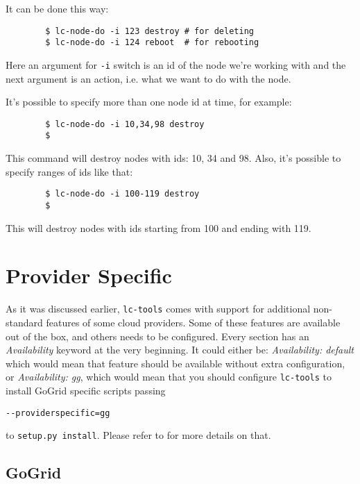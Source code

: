 \documentclass[a4paper]{report}
\begin{document}
	       It can be done this way:

	       \begin{verbatim}
		$ lc-node-do -i 123 destroy # for deleting
		$ lc-node-do -i 124 reboot  # for rebooting
		\end{verbatim}

	       Here an argument for \texttt{-i} switch is an id of the node we're working
	       with and the next argument is an action, i.e. what we want to do with the node.

	       It's possible to specify more than one node id at time, for example:

	       \begin{verbatim}
		$ lc-node-do -i 10,34,98 destroy
		$
		\end{verbatim}

	       This command will destroy nodes with ids: 10, 34 and 98. Also, it's possible to
	       specify ranges of ids like that:

	       \begin{verbatim}
		$ lc-node-do -i 100-119 destroy
		$
		\end{verbatim}

	      This will destroy nodes with ids starting from 100 and ending with 119.

\section{Provider Specific} \label{provspec}

As it was discussed earlier, {\tt lc-tools} comes with support for additional
non-standard features of some cloud providers. Some of these features are available
out of the box, and others needs to be configured. Every section has an
\textit{Availability} keyword at the very beginning. It could either be:
\textit{Availability: default} which would mean that feature should be available
without extra configuration, or \textit{Availability: gg}, which would mean
that you should configure {\tt lc-tools} to install GoGrid specific scripts passing

\begin{verbatim}
--providerspecific=gg
\end{verbatim}

to \texttt{setup.py install}. Please refer to  for more details on that.

\subsection{GoGrid}
\end{document}
